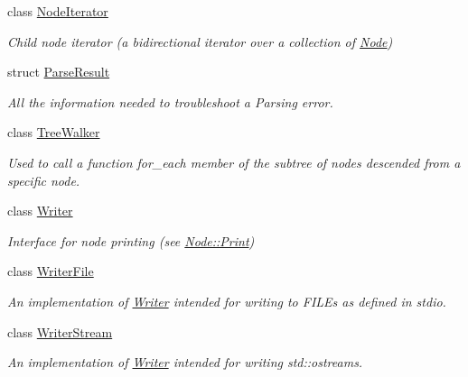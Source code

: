 \begin{DoxyCompactItemize}
class \hyperlink{classMezzanine_1_1xml_1_1NodeIterator}{NodeIterator}
\begin{DoxyCompactList}\small\item\em Child node iterator (a bidirectional iterator over a collection of \hyperlink{classMezzanine_1_1xml_1_1Node}{Node}) \item\end{DoxyCompactList}\item 
struct \hyperlink{structMezzanine_1_1xml_1_1ParseResult}{ParseResult}
\begin{DoxyCompactList}\small\item\em All the information needed to troubleshoot a Parsing error. \item\end{DoxyCompactList}\item 
class \hyperlink{classMezzanine_1_1xml_1_1TreeWalker}{TreeWalker}
\begin{DoxyCompactList}\small\item\em Used to call a function for\_\-each member of the subtree of nodes descended from a specific node. \item\end{DoxyCompactList}\item 
class \hyperlink{classMezzanine_1_1xml_1_1Writer}{Writer}
\begin{DoxyCompactList}\small\item\em Interface for node printing (see \hyperlink{classMezzanine_1_1xml_1_1Node_a94b9b66aff6d1d6a26c1dd5949fabb25}{Node::Print}) \item\end{DoxyCompactList}\item 
class \hyperlink{classMezzanine_1_1xml_1_1WriterFile}{WriterFile}
\begin{DoxyCompactList}\small\item\em An implementation of \hyperlink{classMezzanine_1_1xml_1_1Writer}{Writer} intended for writing to FILEs as defined in stdio. \item\end{DoxyCompactList}\item 
class \hyperlink{classMezzanine_1_1xml_1_1WriterStream}{WriterStream}
\begin{DoxyCompactList}\small\item\em An implementation of \hyperlink{classMezzanine_1_1xml_1_1Writer}{Writer} intended for writing std::ostreams. \item\end{DoxyCompactList}\item 

\end{DoxyCompactItemize}
